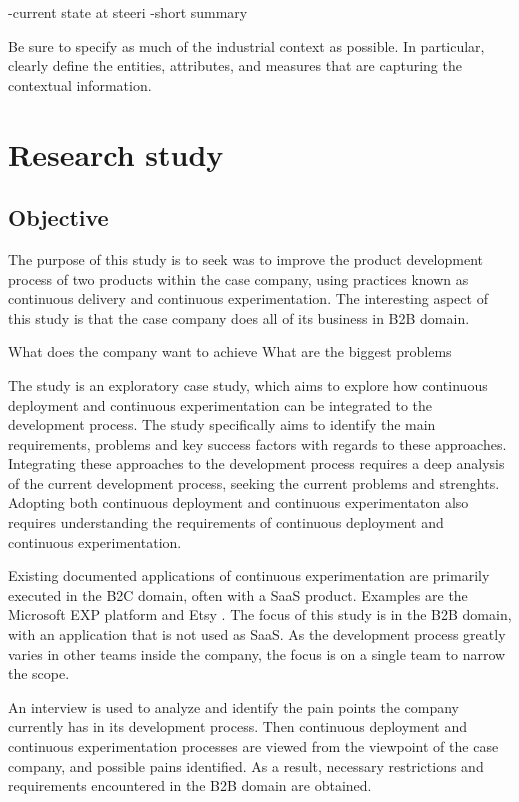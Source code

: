 \documentclass[english]{tktltiki2}
\theoremstyle{definition}
\theoremstyle{remark}
\begin{document}
\cite{olsson2012climbing}

-current state at steeri
    -short summary

Be sure to specify as much of the industrial context as possible. In particular,
clearly deﬁne the entities, attributes, and measures that are capturing the contextual information.

\section{Research study}

\subsection{Objective} %

The purpose of this study is to seek was to improve the product development process of two products within the case company, using practices known as continuous delivery and continuous experimentation. The interesting aspect of this study is that the case company does all of its business in B2B domain. 


What does the company want to achieve
What are the biggest problems


The study is an exploratory case study, which aims to explore how continuous deployment and continuous experimentation can be integrated to the development process. The study specifically aims to identify the main requirements, problems and key success factors with regards to these approaches. Integrating these approaches to the development process requires a deep analysis of the current development process, seeking the current problems and strenghts. Adopting both continuous deployment and continuous experimentaton also requires understanding the requirements of continuous deployment and continuous experimentation. 

Existing documented applications of continuous experimentation are primarily executed in the B2C domain, often with a SaaS product. Examples are the Microsoft EXP platform \cite{ep} and Etsy \cite{}. The focus of this study is in the B2B domain, with an application that is not used as SaaS. As the development process greatly varies in other teams inside the company, the focus is on a single team to narrow the scope.

An interview is used to analyze and identify the pain points the company currently has in its development process. Then continuous deployment and continuous experimentation processes are viewed from the viewpoint of the case company, and possible pains identified. As a result, necessary restrictions and requirements encountered in the B2B domain are obtained. 
\end{document}

